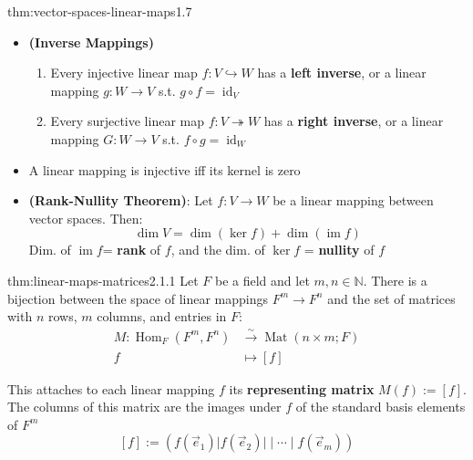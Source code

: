 \documentclass[landscape, 8pt]{extarticle}
\DeclareMathOperator{\im}{im}
\DeclareMathOperator{\Mat}{Mat}
\DeclareMathOperator{\Hom}{Hom}
\DeclareMathOperator{\id}{id}
\begin{document}
\begin{multicols}{3}
\begin{thm}{thm:vector-spaces-linear-maps}{1.7}
\begin{itemize}
        \item[\textbf{1.7.9}:] \textbf{(Inverse Mappings)}
            \begin{enumerate}[leftmargin=*]
                \setlength\itemsep{0em}
                \item Every injective linear map $f : V \hookrightarrow W$ has a \textbf{left inverse}, or a linear mapping $g : W \to V$ s.t. $g \circ f = \id_{V}$
                \item Every surjective linear map $f : V \twoheadrightarrow W$ has a \textbf{right inverse}, or a linear mapping $G : W \to V$ s.t. $f \circ g = \id_{W}$
            \end{enumerate}
        \item[\textbf{1.8.2}] A linear mapping is injective iff its kernel is zero
        \item[\textbf{1.8.4}] \textbf{(Rank-Nullity Theorem)}: Let $f : V \to W$ be a linear mapping between vector spaces. Then:
        \[\dim V = \dim(\ker f) + \dim (\im f)\]
        Dim. of $\im f$= \textbf{rank} of $f$, and the dim. of $\ker f$ = \textbf{nullity} of $f$
    \end{itemize}
\end{thm}



\begin{thm}{thm:linear-maps-matrices}{2.1.1}
    Let $F$ be a field and let $m,n\in \mathbb{N}$. There is a bijection between the space of linear mappings $F^{m}\to F^{n}$ and the set of matrices with $n$ rows, $m$ columns, and entries in $F$:
    \begin{align*}
        M : \Hom_{F}(F^{m}, F^{n}) &\xrightarrow{\sim} \Mat(n \times m; F)\\
        f &\mapsto [f]
    \end{align*}

    This attaches to each linear mapping $f$ its \textbf{representing matrix} $M(f) := [f]$. The columns of this matrix are the images under $f$ of the standard basis elements of $F^{m}$
    \[[f] := (f(\vec{e}_{1}) \lvert f(\vec{e}_{2}) \rvert \mid \cdots \mid f(\vec{e}_{m}))\]
\end{thm}





\end{multicols}
\end{document}
